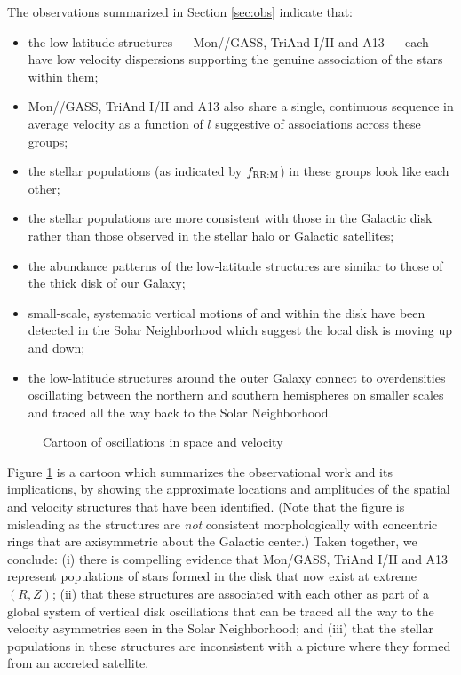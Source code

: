 \documentclass[galaxies,article,submit,moreauthors,pdftex,10pt,a4paper]{mdpi}
\begin{document}
The observations summarized in Section \ref{sec:obs} indicate that:
\begin{itemize}
\item the low latitude structures --- Mon//GASS, TriAnd I/II and A13  --- each have low velocity dispersions supporting the genuine association of the stars within them;
\item Mon//GASS, TriAnd I/II and A13 also share a single, continuous sequence in average velocity as a function of $l$ suggestive of associations across these groups;
\item the stellar populations (as indicated by $f_{\rm RR:M}$) in these groups look like each other;
\item the stellar populations are more consistent with those in the Galactic disk rather than those observed in the stellar halo or Galactic  satellites;
\item the abundance patterns  of the low-latitude structures are similar to those of the thick disk of our Galaxy;
\item small-scale, systematic vertical motions of and within the disk have been detected in the Solar Neighborhood which suggest the local disk is moving up and down;
\item the low-latitude structures around the outer Galaxy connect to overdensities oscillating between the northern and southern hemispheres on smaller scales and traced all the way back to the Solar Neighborhood.
\end{itemize}

\begin{figure}[t]
\centering
\caption{\label{fig:cartoon}
Cartoon of oscillations in space and velocity}
\end{figure}

Figure \ref{fig:cartoon} is a cartoon which summarizes the observational work and its implications, by showing the approximate locations and amplitudes of the spatial and velocity structures that have been identified. (Note that the figure is misleading as the structures are {\it not} consistent morphologically with concentric rings that are axisymmetric about the Galactic center.)
Taken together, we conclude: (i) there is compelling evidence that Mon/GASS, TriAnd I/II and A13 represent populations of stars formed in the disk that now exist at extreme $(R,Z)$;
(ii) that these structures are associated with each other as part of a global system of vertical disk oscillations that can be traced all the way to the velocity asymmetries seen in the Solar Neighborhood; and
(iii) that the stellar populations in these structures are inconsistent with a picture where they formed from an accreted satellite.
\end{document}
